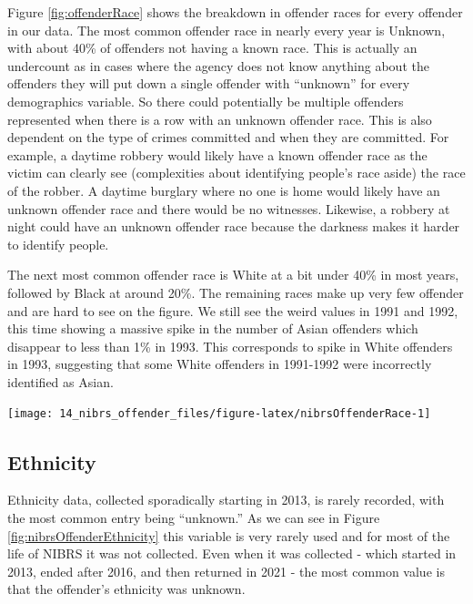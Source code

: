\documentclass[
]{krantz}
\let\origfigure\figure
\let\endorigfigure\endfigure
\renewenvironment{figure}[1][2] {
    \expandafter\origfigure\expandafter[H]
} {
    \endorigfigure
}
\begin{document}
Figure \ref{fig:offenderRace} shows the breakdown in
offender races for every offender in our data. The most
common offender race in nearly every year is Unknown, with
about 40\% of offenders not having a known race. This is
actually an undercount as in cases where the agency does not
know anything about the offenders they will put down a
single offender with ``unknown'' for every demographics
variable. So there could potentially be multiple offenders
represented when there is a row with an unknown offender
race. This is also dependent on the type of crimes committed
and when they are committed. For example, a daytime robbery
would likely have a known offender race as the victim can
clearly see (complexities about identifying people's race
aside) the race of the robber. A daytime burglary where no
one is home would likely have an unknown offender race and
there would be no witnesses. Likewise, a robbery at night
could have an unknown offender race because the darkness
makes it harder to identify people.

The next most common offender race is White at a bit under
40\% in most years, followed by Black at around 20\%. The
remaining races make up very few offender and are hard to
see on the figure. We still see the weird values in 1991 and
1992, this time showing a massive spike in the number of
Asian offenders which disappear to less than 1\% in 1993.
This corresponds to spike in White offenders in 1993,
suggesting that some White offenders in 1991-1992 were
incorrectly identified as Asian.

\begin{figure}

{\centering \texttt{[image: 14\_nibrs\_offender\_files/figure-latex/nibrsOffenderRace-1]} 

}

\caption{The share of offenders by race, 1991-2023.}\label{fig:nibrsOffenderRace}
\end{figure}

\subsection{Ethnicity}\label{ethnicity-2}

Ethnicity data, collected sporadically starting in 2013, is
rarely recorded, with the most common entry being
``unknown.'' As we can see in Figure
\ref{fig:nibrsOffenderEthnicity} this variable is very
rarely used and for most of the life of NIBRS it was not
collected. Even when it was collected - which started in
2013, ended after 2016, and then returned in 2021 - the most
common value is that the offender's ethnicity was unknown.
\end{document}
